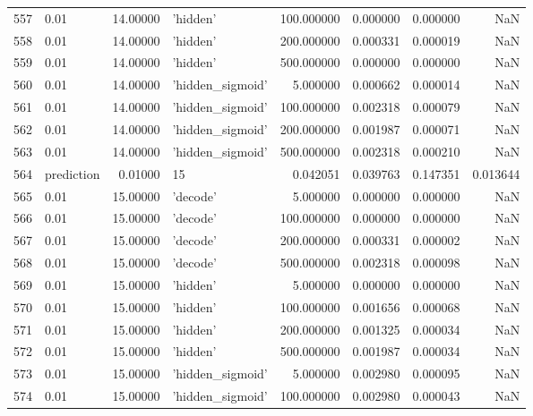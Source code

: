 \documentclass[10pt,a4paper]{article}
\begin{document}
\begin{tabular}{llrlrrrr}
557  &        0.01 &  14.00000 &           'hidden' &  100.000000 &  0.000000 &  0.000000 &       NaN \\
558  &        0.01 &  14.00000 &           'hidden' &  200.000000 &  0.000331 &  0.000019 &       NaN \\
559  &        0.01 &  14.00000 &           'hidden' &  500.000000 &  0.000000 &  0.000000 &       NaN \\
560  &        0.01 &  14.00000 &   'hidden\_sigmoid' &    5.000000 &  0.000662 &  0.000014 &       NaN \\
561  &        0.01 &  14.00000 &   'hidden\_sigmoid' &  100.000000 &  0.002318 &  0.000079 &       NaN \\
562  &        0.01 &  14.00000 &   'hidden\_sigmoid' &  200.000000 &  0.001987 &  0.000071 &       NaN \\
563  &        0.01 &  14.00000 &   'hidden\_sigmoid' &  500.000000 &  0.002318 &  0.000210 &       NaN \\
564  &  prediction &   0.01000 &                 15 &    0.042051 &  0.039763 &  0.147351 &  0.013644 \\
565  &        0.01 &  15.00000 &           'decode' &    5.000000 &  0.000000 &  0.000000 &       NaN \\
566  &        0.01 &  15.00000 &           'decode' &  100.000000 &  0.000000 &  0.000000 &       NaN \\
567  &        0.01 &  15.00000 &           'decode' &  200.000000 &  0.000331 &  0.000002 &       NaN \\
568  &        0.01 &  15.00000 &           'decode' &  500.000000 &  0.002318 &  0.000098 &       NaN \\
569  &        0.01 &  15.00000 &           'hidden' &    5.000000 &  0.000000 &  0.000000 &       NaN \\
570  &        0.01 &  15.00000 &           'hidden' &  100.000000 &  0.001656 &  0.000068 &       NaN \\
571  &        0.01 &  15.00000 &           'hidden' &  200.000000 &  0.001325 &  0.000034 &       NaN \\
572  &        0.01 &  15.00000 &           'hidden' &  500.000000 &  0.001987 &  0.000034 &       NaN \\
573  &        0.01 &  15.00000 &   'hidden\_sigmoid' &    5.000000 &  0.002980 &  0.000095 &       NaN \\
574  &        0.01 &  15.00000 &   'hidden\_sigmoid' &  100.000000 &  0.002980 &  0.000043 &       NaN \\

\end{tabular}
\end{document}
